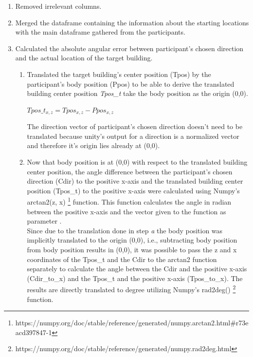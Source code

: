 \begin{enumerate}
	\item Removed irrelevant columns.
	\item Merged the dataframe containing the information about the starting locations with the main dataframe gathered from the participants.
	\item Calculated the absolute angular error between participant's chosen direction and the actual location of the target building.
	
	\begin{enumerate}
		\item Translated the target building's center position {\emphasize(Tpos)} by the participant's body position {\emphasize(Ppos)} to be able to derive the translated building center position {\emph{Tpos\_t}} take the body position as the origin (0,0).
			\begin{center}
				$Tpos\_t_{x,z}= Tpos_{x,z} - Ppos_{x,z}$
			\end{center}
		The direction vector of participant's chosen direction doesn't need to be translated because unity's output for a direction is a normalized vector and therefore it's origin lies already at (0,0).\\
		
		\item Now that body position is at (0,0) with respect to the translated building center position, the angle difference between the participant's chosen direction {\emphasize(Cdir)} to the positive x-axis and the translated building center position {\emphasize(Tpos\_t)} to the positive x-axis were calculated using Numpy's arctan2(z, x)  \footnote{https://numpy.org/doc/stable/reference/generated/numpy.arctan2.html\#r73eacd397847-1} function. This function calculates the angle in radian between the positive x-axis and the vector given to the function as parameter . \\
		Since due to the translation done in step \emph{a} the body position was implicitly translated to the origin (0,0), i.e., subtracting body position from body position results in (0,0), it was possible to pass the z and x coordinates of the {\emphasize Tpos\_t} and the {\emphasize Cdir} to the arctan2 function separately to calculate the angle between the {\emphasize Cdir} and the positive x-axis {\emphasize (Cdir\_to\_x)} and the {\emphasize Tpos\_t} and the positive x-axis {\emphasize (Tpos\_to\_x)}. The results are directly translated to degree utilizing Numpy's rad2deg()  \footnote{https://numpy.org/doc/stable/reference/generated/numpy.rad2deg.html} function.
		

\end{enumerate}
\end{enumerate}
